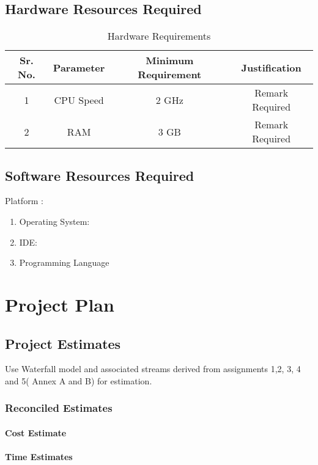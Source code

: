 \documentclass[oneside,a4paper,12pt]{report}
\begin{document}
\section{Hardware Resources Required}
\begin{table}[!htbp]
\begin{center}
\def\arraystretch{1.5}
  \begin{tabular}{| c | c | c | c |}
\hline
Sr. No. &	Parameter &	Minimum Requirement & Justification \\
\hline
1 &	CPU Speed &	 2 GHz  & Remark Required\\
\hline
2 &	RAM  &	3 GB &  Remark Required\\
 \hline
\end{tabular}
 \caption { Hardware Requirements }
 \label{tab:hreq}
\end{center}

\end{table}


\section{Software Resources Required}
Platform : 
\begin{enumerate}
\item Operating System: 
\item IDE: 
\item Programming Language
\end{enumerate}




\chapter{Project Plan}

\section{Project Estimates}
                 Use Waterfall model and associated streams derived from assignments 1,2, 3, 4 and 5( Annex A and B) for estimation. 
\subsection{Reconciled Estimates}
\subsubsection{Cost Estimate}

\subsubsection{Time Estimates}
\end{document}
